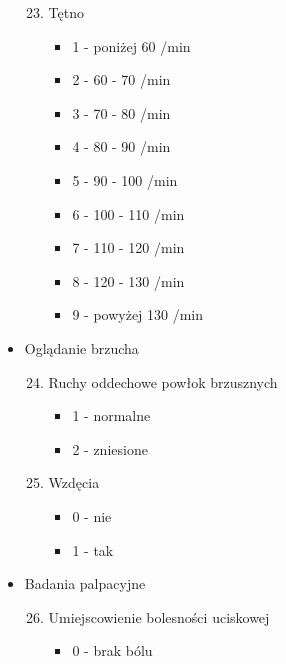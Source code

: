 \documentclass{report}
\begin{document}
\begin{itemize}
        \begin{enumerate}
            \setcounter{enumi}{22}
            \item Tętno
            \begin{itemize}
                \item 1 - poniżej 60 /min
                \item 2 - 60 - 70 /min
                \item 3 - 70 - 80 /min
                \item 4 - 80 - 90 /min
                \item 5 - 90 - 100 /min
                \item 6 - 100 - 110 /min
                \item 7 - 110 - 120 /min
                \item 8 - 120 - 130 /min
                \item 9 - powyżej 130 /min
            \end{itemize}
        \end{enumerate}
        \item Oglądanie brzucha
        \begin{enumerate}
            \setcounter{enumi}{23}
            \item Ruchy oddechowe powłok brzusznych
            \begin{itemize}
                \item 1 - normalne
                \item 2 - zniesione
            \end{itemize}
        \end{enumerate}
        \begin{enumerate}
            \setcounter{enumi}{24}
            \item Wzdęcia
            \begin{itemize}
                \item 0 - nie
                \item 1 - tak
            \end{itemize}
        \end{enumerate}
        \item Badania palpacyjne
        \begin{enumerate}
            \setcounter{enumi}{25}
            \item Umiejscowienie bolesności uciskowej
            \begin{itemize}
                \item 0 - brak bólu

\end{itemize}
\end{enumerate}
\end{itemize}
\end{document}
